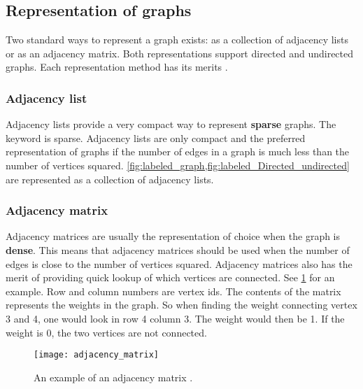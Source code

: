 

\subsection{Representation of graphs}

Two standard ways to represent a graph exists: as a collection of adjacency lists or as an adjacency matrix. Both representations support directed and undirected graphs. Each representation method has its merits \cite{Cormen2009}.

\subsubsection{Adjacency list}
Adjacency lists provide a very compact way to represent \textbf{sparse} graphs. The keyword is sparse. Adjacency lists are only compact and the preferred representation of graphs if the number of edges in a graph is much less than the number of vertices squared. \cref{fig:labeled_graph,fig:labeled_Directed_undirected} are represented as a collection of adjacency lists.

\subsubsection{Adjacency matrix}
Adjacency matrices are usually the representation of choice when the graph is \textbf{dense}. This means that adjacency matrices should be used when the number of edges is close to the number of vertices squared. Adjacency matrices also has the merit of providing quick lookup of which vertices are connected. See \cref{fig:adjacency_matrix} for an example. Row and column numbers are vertex ids. The contents of the matrix represents the weights in the graph. So when finding the weight connecting vertex 3 and 4, one would look in row 4 column 3. The weight would then be 1. If the weight is 0, the two vertices are not connected.

\begin{figure}[ht!]
    \centering
    \texttt{[image: adjacency\_matrix]}
    \caption{An example of an adjacency matrix \cite{Cormen2009}.}
    \label{fig:adjacency_matrix}
  \end{figure}


